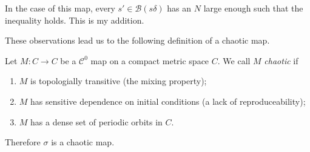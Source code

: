 \begin{remark}[]
	In the case of this map, every $s'\in \mathcal{B}\left(s \delta \right)$ has an $N$ large enough such that the inequality holds.
	{\color{blue} This is my addition.}
\end{remark}

These observations lead us to the following definition of a chaotic map.

\begin{definition}
	Let $M:C\to C$ be a $\mathcal{C}^{0}$ map on a compact metric space $C$. We call $M$ \emph{chaotic} if
	\begin{enumerate}
		\item $M$ is topologially transitive (the mixing property);
		\item $M$ has sensitive dependence on initial conditions (a lack of reproduceability);
		\item $M$ has a dense set of periodic orbits in $C$.
	\end{enumerate}
\end{definition}
Therefore $\sigma$ is a chaotic map.
